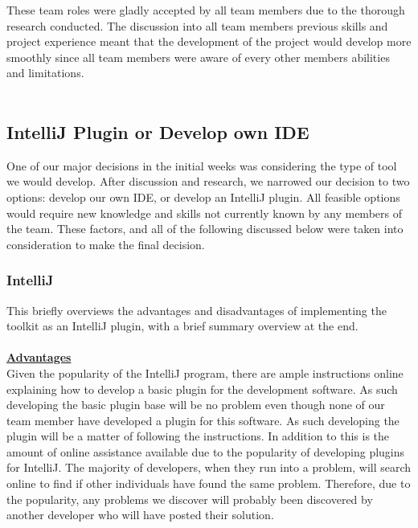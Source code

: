 \documentclass{l3proj}
\begin{document}
These team roles were gladly accepted by all team members due to the thorough research conducted. The discussion into all team members previous skills and project experience meant that the development of the project would develop more smoothly since all team members were aware of every other members abilities and limitations.\\
\\

\subsection{IntelliJ Plugin or Develop own IDE}

One of our major decisions in the initial weeks was considering the type of tool we would develop. After discussion and research, we narrowed our decision to two options: develop our own IDE, or develop an IntelliJ plugin.  All feasible options would require new knowledge and skills not currently known by any members of the team. These factors, and all of the following discussed below were taken into consideration to make the final decision.
\\
\subsubsection{IntelliJ}
This briefly overviews the advantages and disadvantages of implementing the toolkit as an IntelliJ plugin, with a brief summary overview at the end.\\
\\
\textbf {\underline{Advantages}}\\
Given the popularity of the IntelliJ program, there are ample instructions online explaining how to develop a basic plugin for the development software. As such developing the basic plugin base will be no problem even though none of our team member have developed a plugin for this software. As such developing the plugin will be a matter of following the instructions. In addition to this is the amount of online assistance available due to the popularity of developing plugins for IntelliJ. The majority of developers, when they run into a problem, will search online to find if other individuals have found the same problem. Therefore, due to the popularity, any problems we discover will probably been discovered by another developer who will have posted their solution. \\
 \\
\end{document}
